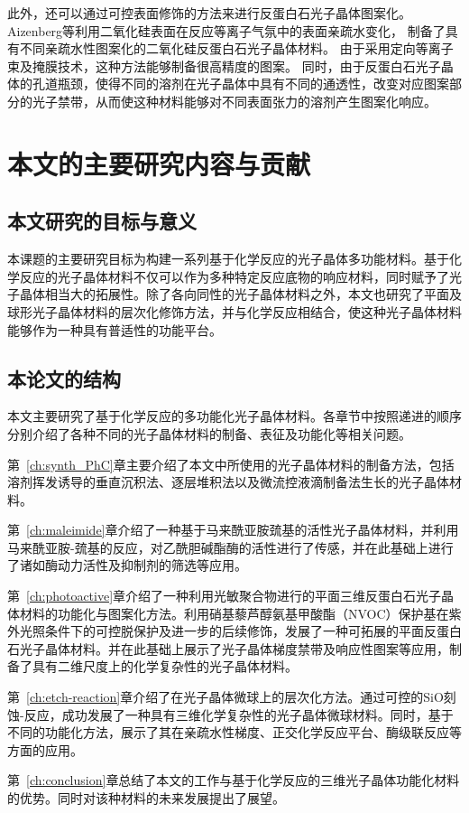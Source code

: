 此外，还可以通过可控表面修饰的方法来进行反蛋白石光子晶体图案化。
Aizenberg等利用二氧化硅表面在反应等离子气氛中的表面亲疏水变化，
制备了具有不同亲疏水性图案化的二氧化硅反蛋白石光子晶体材料\cite{Burgess2012Encoding}。
由于采用定向等离子束及掩膜技术，这种方法能够制备很高精度的图案。
同时，由于反蛋白石光子晶体的孔道瓶颈，使得不同的溶剂在光子晶体中具有不同的通透性，改变对应图案部分的光子禁带，从而使这种材料能够对不同表面张力的溶剂产生图案化响应。

\section{本文的主要研究内容与贡献}
\label{sec:contribute}

\subsection{本文研究的目标与意义}
本课题的主要研究目标为构建一系列基于化学反应的光子晶体多功能材料。基于化学反应的光子晶体材料不仅可以作为多种特定反应底物的响应材料，同时赋予了光子晶体相当大的拓展性。除了各向同性的光子晶体材料之外，本文也研究了平面及球形光子晶体材料的层次化修饰方法，并与化学反应相结合，使这种光子晶体材料能够作为一种具有普适性的功能平台。

\subsection{本论文的结构}
\label{subsec:chapters}

本文主要研究了基于化学反应的多功能化光子晶体材料。各章节中按照递进的顺序分别介绍了各种不同的光子晶体材料的制备、表征及功能化等相关问题。

第~\ref{ch:synth_PhC}章主要介绍了本文中所使用的光子晶体材料的制备方法，包括溶剂挥发诱导的垂直沉积法、逐层堆积法以及微流控液滴制备法生长的光子晶体材料。

第~\ref{ch:maleimide}章介绍了一种基于马来酰亚胺巯基的活性光子晶体材料，并利用马来酰亚胺-巯基的反应，对乙酰胆碱酯酶的活性进行了传感，并在此基础上进行了诸如酶动力活性及抑制剂的筛选等应用。

第~\ref{ch:photoactive}章介绍了一种利用光敏聚合物进行的平面三维反蛋白石光子晶体材料的功能化与图案化方法。利用硝基藜芦醇氨基甲酸酯（NVOC）保护基在紫外光照条件下的可控脱保护及进一步的后续修饰，发展了一种可拓展的平面反蛋白石光子晶体材料。并在此基础上展示了光子晶体梯度禁带及响应性图案等应用，制备了具有二维尺度上的化学复杂性的光子晶体材料。

第~\ref{ch:etch-reaction}章介绍了在光子晶体微球上的层次化方法。通过可控的SiO刻蚀-反应，成功发展了一种具有三维化学复杂性的光子晶体微球材料。同时，基于不同的功能化方法，展示了其在亲疏水性梯度、正交化学反应平台、酶级联反应等方面的应用。

第~\ref{ch:conclusion}章总结了本文的工作与基于化学反应的三维光子晶体功能化材料的优势。同时对该种材料的未来发展提出了展望。


